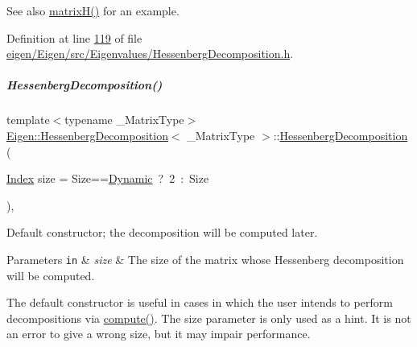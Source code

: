\begin{DoxySeeAlso}{See also}
\hyperlink{group___eigenvalues___module_a8e781d2e22a2304647bcf0ae913cc8ea}{matrix\+H()} for an example. 
\end{DoxySeeAlso}


Definition at line \hyperlink{eigen_2_eigen_2src_2_eigenvalues_2_hessenberg_decomposition_8h_source_l00119}{119} of file \hyperlink{eigen_2_eigen_2src_2_eigenvalues_2_hessenberg_decomposition_8h_source}{eigen/\+Eigen/src/\+Eigenvalues/\+Hessenberg\+Decomposition.\+h}.

\mbox{\label{group___eigenvalues___module_aee1724cb6418ede1a8b9045036a5a319}} 
\subparagraph{\texorpdfstring{Hessenberg\+Decomposition()}{HessenbergDecomposition()}\hspace{0.1cm}{\footnotesize\ttfamily [3/4]}}
{\footnotesize\ttfamily template$<$typename \+\_\+\+Matrix\+Type$>$ \\
\hyperlink{group___eigenvalues___module_class_eigen_1_1_hessenberg_decomposition}{Eigen\+::\+Hessenberg\+Decomposition}$<$ \+\_\+\+Matrix\+Type $>$\+::\hyperlink{group___eigenvalues___module_class_eigen_1_1_hessenberg_decomposition}{Hessenberg\+Decomposition} (\begin{DoxyParamCaption}\item[{\hyperlink{group___eigenvalues___module_a8e287ac222f53e2c8ce82faa43e95ac6}{Index}}]{size = {\ttfamily Size==\hyperlink{namespace_eigen_ad81fa7195215a0ce30017dfac309f0b2}{Dynamic}~?~2~\+:~Size} }\end{DoxyParamCaption})\hspace{0.3cm}{\ttfamily [inline]}, {\ttfamily [explicit]}}



Default constructor; the decomposition will be computed later. 


\begin{DoxyParams}[1]{Parameters}
\mbox{\tt in}  & {\em size} & The size of the matrix whose Hessenberg decomposition will be computed.\\
\hline
\end{DoxyParams}
The default constructor is useful in cases in which the user intends to perform decompositions via \hyperlink{group___eigenvalues___module_a239a6fd42c57aab3c0b048c47fde3004}{compute()}. The {\ttfamily size} parameter is only used as a hint. It is not an error to give a wrong {\ttfamily size}, but it may impair performance.

